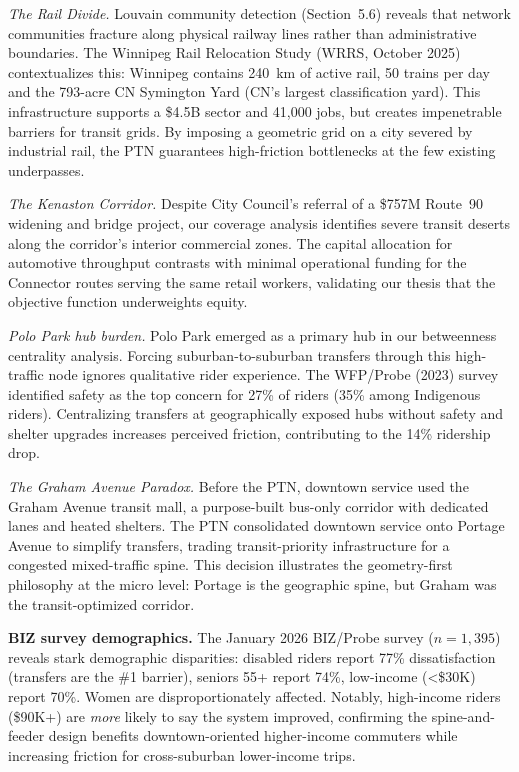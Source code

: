 \documentclass[11pt]{article}
\begin{document}
\emph{The Rail Divide.} Louvain community detection (Section~5.6) reveals that network communities fracture along physical railway lines rather than administrative boundaries. The Winnipeg Rail Relocation Study (WRRS, October 2025) contextualizes this: Winnipeg contains 240~km of active rail, 50 trains per day and the 793-acre CN Symington Yard (CN's largest classification yard). This infrastructure supports a \$4.5B sector and 41,000 jobs, but creates impenetrable barriers for transit grids. By imposing a geometric grid on a city severed by industrial rail, the PTN guarantees high-friction bottlenecks at the few existing underpasses.

\emph{The Kenaston Corridor.} Despite City Council's referral of a \$757M Route~90 widening and bridge project, our coverage analysis identifies severe transit deserts along the corridor's interior commercial zones. The capital allocation for automotive throughput contrasts with minimal operational funding for the Connector routes serving the same retail workers, validating our thesis that the objective function underweights equity.

\emph{Polo Park hub burden.} Polo Park emerged as a primary hub in our betweenness centrality analysis. Forcing suburban-to-suburban transfers through this high-traffic node ignores qualitative rider experience. The WFP/Probe (2023) survey identified safety as the top concern for 27\% of riders (35\% among Indigenous riders). Centralizing transfers at geographically exposed hubs without safety and shelter upgrades increases perceived friction, contributing to the 14\% ridership drop.

\emph{The Graham Avenue Paradox.} Before the PTN, downtown service used the Graham Avenue transit mall, a purpose-built bus-only corridor with dedicated lanes and heated shelters. The PTN consolidated downtown service onto Portage Avenue to simplify transfers, trading transit-priority infrastructure for a congested mixed-traffic spine. This decision illustrates the geometry-first philosophy at the micro level: Portage is the geographic spine, but Graham was the transit-optimized corridor.

\textbf{BIZ survey demographics.} The January 2026 BIZ/Probe survey ($n=1{,}395$) reveals stark demographic disparities: disabled riders report 77\% dissatisfaction (transfers are the \#1 barrier), seniors 55+ report 74\%, low-income (\textless\$30K) report 70\%. Women are disproportionately affected. Notably, high-income riders (\$90K+) are \emph{more} likely to say the system improved, confirming the spine-and-feeder design benefits downtown-oriented higher-income commuters while increasing friction for cross-suburban lower-income trips.
\end{document}
